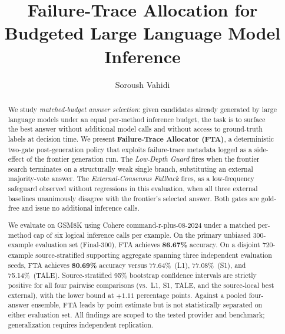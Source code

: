 \documentclass[smallcondensed]{svjour3}
\begin{document}
\title{Failure-Trace Allocation for Budgeted Large Language Model Inference}

\author{Soroush Vahidi}


\date{}
\maketitle

\begin{abstract}
We study \emph{matched-budget answer selection}: given candidates already
generated by large language models under an equal per-method inference budget,
the task is to surface the best answer without additional model calls and without
access to ground-truth labels at decision time.
We present \textbf{Failure-Trace Allocator (FTA)}, a deterministic two-gate
post-generation policy that exploits failure-trace metadata logged as a
side-effect of the frontier generation run.
The \emph{Low-Depth Guard} fires when the frontier search terminates on a
structurally weak single branch, substituting an external majority-vote answer.
The \emph{External-Consensus Fallback} fires, as a low-frequency safeguard observed without regressions in this
evaluation, when all three external baselines unanimously disagree with the
frontier's selected answer.
Both gates are gold-free and issue no additional inference calls.

We evaluate on GSM8K using Cohere command-r-plus-08-2024 under a matched
per-method cap of six logical inference calls per example.
On the primary unbiased 300-example evaluation set (Final-300), FTA achieves
\textbf{86.67\%} accuracy.
On a disjoint 720-example source-stratified supporting aggregate spanning three independent
evaluation seeds, FTA achieves \textbf{80.69\%} accuracy versus 77.64\%~(L1),
77.08\%~(S1), and 75.14\%~(TALE).
Source-stratified 95\% bootstrap confidence intervals are strictly positive
for all four pairwise comparisons (vs.\ L1, S1, TALE, and the source-local
best external), with the lower bound at $+1.11$ percentage points.
Against a pooled four-answer ensemble, FTA leads by point estimate but is not
statistically separated on either evaluation set.
All findings are scoped to the tested provider and benchmark; generalization
requires independent replication.
\end{abstract}
\end{document}
